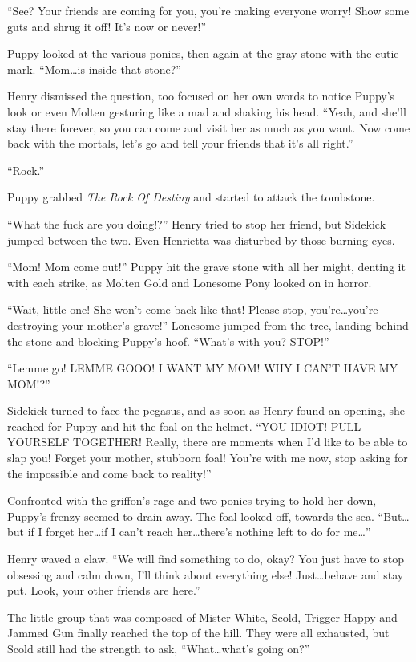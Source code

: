 ``See? Your friends are coming for you, you're making everyone worry! Show some guts and shrug it off! It's now or never!''

Puppy looked at the various ponies, then again at the gray stone with the cutie mark. ``Mom\dots is inside that stone?''

Henry dismissed the question, too focused on her own words to notice Puppy's look or even Molten gesturing like a mad and shaking his head. ``Yeah, and she'll stay there forever, so you can come and visit her as much as you want. Now come back with the mortals, let's go and tell your friends that it's all right.''

``Rock.''

Puppy grabbed \emph{The Rock Of Destiny} and started to attack the tombstone.

``What the fuck are you doing!?'' Henry tried to stop her friend, but Sidekick jumped between the two. Even Henrietta was disturbed by those burning eyes.

``Mom! Mom come out!'' Puppy hit the grave stone with all her might, denting it with each strike, as Molten Gold and Lonesome Pony looked on in horror.

``Wait, little one! She won't come back like that! Please stop, you're\dots you're destroying your mother's grave!'' Lonesome jumped from the tree, landing behind the stone and blocking Puppy's hoof. ``What's with you? STOP!''

``Lemme go! LEMME GOOO! I WANT MY MOM! WHY I CAN'T HAVE MY MOM!?''

Sidekick turned to face the pegasus, and as soon as Henry found an opening, she reached for Puppy and hit the foal on the helmet. ``YOU IDIOT! PULL YOURSELF TOGETHER! Really, there are moments when I'd like to be able to slap you! Forget your mother, stubborn foal! You're with me now, stop asking for the impossible and come back to reality!''

Confronted with the griffon's rage and two ponies trying to hold her down, Puppy's frenzy seemed to drain away. The foal looked off, towards the sea. ``But\dots but if I forget her\dots if I can't reach her\dots there's nothing left to do for me\dots''

Henry waved a claw. ``We will find something to do, okay? You just have to stop obsessing and calm down, I'll think about everything else! Just\dots behave and stay put. Look, your other friends are here.''

The little group that was composed of Mister White, Scold, Trigger Happy and Jammed Gun finally reached the top of the hill. They were all exhausted, but Scold still had the strength to ask, ``What\dots what's going on?''

